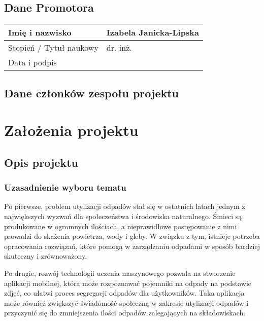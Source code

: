 \documentclass[12pt,oneside]{book}
\begin{document}
\section{Dane Promotora}

\begin{tabular}{ |p{5cm}|p{9cm}|}
    \hline
    Imię i nazwisko & Izabela Janicka-Lipska \\
    \hline
    Stopień / Tytuł naukowy & dr. inż. \\
    \hline
    Data i podpis &  \\ \hline
\end{tabular}


\pagestyle{plain}

\section{Dane członków zespołu projektu}

\membersTable

{\let\clearpage\relax
    \chapter{Założenia projektu}
    }

\section{Opis projektu}

\subsection{Uzasadnienie wyboru tematu}

Po pierwsze, problem utylizacji odpadów stał się w ostatnich latach jednym z największych wyzwań dla społeczeństwa i środowiska naturalnego. Śmieci są produkowane w ogromnych ilościach, a nieprawidłowe postępowanie z nimi prowadzi do skażenia powietrza, wody i gleby. W związku z tym, istnieje potrzeba opracowania rozwiązań, które pomogą w zarządzaniu odpadami w sposób bardziej skuteczny i zrównoważony.

Po drugie, rozwój technologii uczenia maszynowego pozwala na stworzenie aplikacji mobilnej, która może rozpoznawać pojemniki na odpady na podstawie zdjęć, co ułatwi proces segregacji odpadów dla użytkowników. Taka aplikacja może również zwiększyć świadomość społeczną w zakresie utylizacji odpadów i przyczynić się do zmniejszenia ilości odpadów zalegających na składowiskach.
\end{document}

